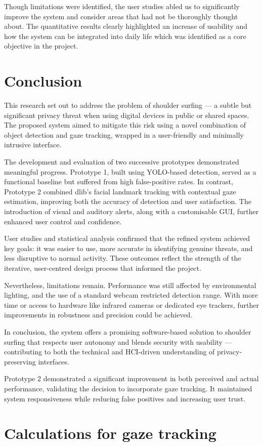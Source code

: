 \documentclass[12pt]{article}
\theoremstyle{plain}
\theoremstyle{definition}
\begin{document}
Though limitations were identified, the user studies abled us to significantly improve the system and consider areas that had not be thoroughly thought about. The quantitative results clearly highlighted an increase of usability and how the system can be integrated into daily life which was identified as a core objective in the project.

\section{Conclusion}

This research set out to address the problem of shoulder surfing — a subtle but significant privacy threat when using digital devices in public or shared spaces. The proposed system aimed to mitigate this risk using a novel combination of object detection and gaze tracking, wrapped in a user-friendly and minimally intrusive interface.

The development and evaluation of two successive prototypes demonstrated meaningful progress. Prototype 1, built using YOLO-based detection, served as a functional baseline but suffered from high false-positive rates. In contrast, Prototype 2 combined dlib’s facial landmark tracking with contextual gaze estimation, improving both the accuracy of detection and user satisfaction. The introduction of visual and auditory alerts, along with a customisable GUI, further enhanced user control and confidence.

User studies and statistical analysis confirmed that the refined system achieved key goals: it was easier to use, more accurate in identifying genuine threats, and less disruptive to normal activity. These outcomes reflect the strength of the iterative, user-centred design process that informed the project.

Nevertheless, limitations remain. Performance was still affected by environmental lighting, and the use of a standard webcam restricted detection range. With more time or access to hardware like infrared cameras or dedicated eye trackers, further improvements in robustness and precision could be achieved.

In conclusion, the system offers a promising software-based solution to shoulder surfing that respects user autonomy and blends security with usability — contributing to both the technical and HCI-driven understanding of privacy-preserving interfaces.



Prototype 2 demonstrated a significant improvement in both perceived and actual performance, validating the decision to incorporate gaze tracking. It maintained system responsiveness while reducing false positives and increasing user trust.


\newpage
\printbibliography 

\clearpage\appendix

\section{Calculations for gaze tracking}
\label{app:gaze_calcs}


\end{document}
